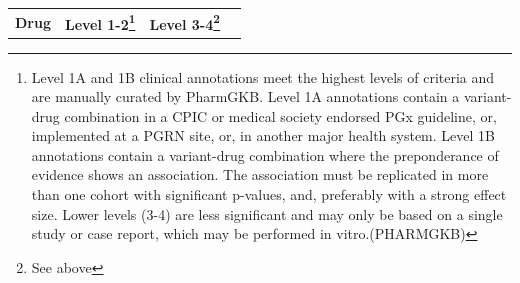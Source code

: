 \documentclass{book}
\begin{document}
\scriptsize
\begin{tabularx}{1.3\textwidth}{XXXX}
\textbf{Drug} & \textbf{Level 1-2\footnote{ Level 1A and 1B clinical annotations meet the highest levels of criteria and are manually curated by PharmGKB. Level 1A annotations contain a variant-drug combination in a CPIC or medical society endorsed PGx guideline, or, implemented at a PGRN site, or, in another major health system. Level 1B annotations contain a variant-drug combination where the preponderance of evidence shows an association. The association must be replicated in more than one cohort with significant p-values, and, preferably with a strong effect size. Lower levels (3-4) are less significant and may only be based on a single study or case report, which may be performed in vitro.(PHARMGKB) }} & \textbf{Level 3-4\footnote{ See above }}   \\

\end{tabularx}
\end{document}

